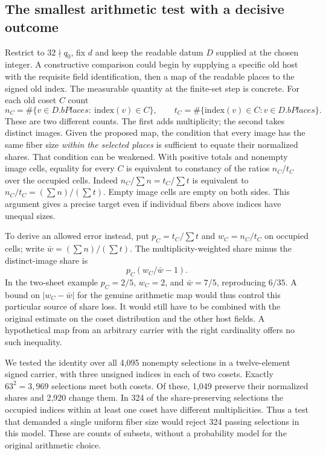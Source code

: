 \documentclass[12pt,letterpaper]{article}
\begin{document}
\subsection{The smallest arithmetic test with a decisive outcome}
Restrict to $32\nmid q_0$, fix $d$ and keep the readable datum $D$ supplied at the chosen integer. A constructive comparison could begin by supplying a specific old host with the requisite field identification, then a map of the readable places to the signed old index. The measurable quantity at the finite-set step is concrete. For each old coset $C$ count
\[
   n_C=\#\{v\in D.bPlaces:\ \mathrm{index}(v)\in C\},
   \qquad t_C=\#\{\mathrm{index}(v)\in C:v\in D.bPlaces\}.
\]
These are two different counts. The first adds multiplicity; the second takes distinct images. Given the proposed map, the condition that every image has the same fiber size \emph{within the selected places} is sufficient to equate their normalized shares. That condition can be weakened. With positive totals and nonempty image cells, equality for every $C$ is equivalent to constancy of the ratios $n_C/t_C$ over the occupied cells. Indeed $n_C/\sum n=t_C/\sum t$ is equivalent to $n_C/t_C=(\sum n)/(\sum t)$. Empty image cells are empty on both sides. This argument gives a precise target even if individual fibers above indices have unequal sizes.

To derive an allowed error instead, put $p_C=t_C/\sum t$ and $w_C=n_C/t_C$ on occupied cells; write $\bar w=(\sum n)/(\sum t)$. The multiplicity-weighted share minus the distinct-image share is
\[
              p_C(w_C/\bar w-1).
\]
In the two-sheet example $p_C=2/5$, $w_C=2$, and $\bar w=7/5$, reproducing $6/35$. A bound on $|w_C-\bar w|$ for the genuine arithmetic map would thus control this particular source of share loss. It would still have to be combined with the original estimate on the coset distribution and the other host fields. A hypothetical map from an arbitrary carrier with the right cardinality offers no such inequality.

We tested the identity over all 4,095 nonempty selections in a twelve-element signed carrier, with three unsigned indices in each of two cosets. Exactly $63^2=3{,}969$ selections meet both cosets. Of these, 1,049 preserve their normalized shares and 2,920 change them. In 324 of the share-preserving selections the occupied indices within at least one coset have different multiplicities. Thus a test that demanded a single uniform fiber size would reject 324 passing selections in this model. These are counts of subsets, without a probability model for the original arithmetic choice.
\end{document}
